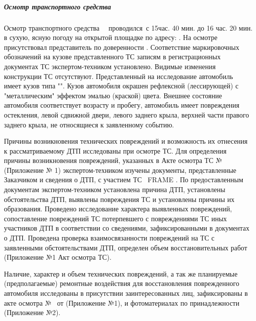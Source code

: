 \subparagraph*{Осмотр транспортного средства }
\noindent \begin{spacing}{1.2} { Осмотр транспортного средства \, \, проводился \osm\,с 15час. 40 мин. до 16 час. 20 мин. в сухую, ясную погоду  на открытой площадке по адресу: . На осмотре присутствовал представитель по доверенности  .  %
Соответствие маркировочных обозначений на кузове представленного ТС записям в регистрационных документах ТС экс\-пертом-техником установлено. Видимые изменения конструкции ТС отсутствуют.  Представленный на исследование автомобиль \tc\, имеет кузов типа "". Кузов автомобиля окрашен  рефлексной (лессирующей) с "металлическим" эффектом 
эмалью (краской) \colr цвета. Внешнее состояние автомобиля соответствует возрасту и пробегу, автомобиль имеет повреждения остекления, левой сдвижной двери, левого заднего крыла, верхней части правого заднего крыла, не относящиеся к заявленному событию.  %
\par Причины возникновения технических повреждений и возможность их отнесения к рассматриваемому ДТП исследованы при осмотре ТС. 
Для определения причины возникновения повреждений, указанных в Акте осмотра ТС 
№ \NomerDoc \, (Приложение № 1) экспертом-техником изучены документы, представленные Заказчиком и сведения о ДТП, с участием ТС  \, FRAME . %
По предоставленным документам экспертом-техником установлена причина ДТП, установлены обстоятельства ДТП, выявлены повреждения ТС и установлены причины их образования. Проведено исследование характера выявленных повреждений, сопоставление повреждений ТС потерпевшего с повреждениями ТС иных участников ДТП в соответствии со сведениями, зафиксированными в документах о ДТП. Проведена проверка взаимосвязанности повреждений на ТС с заявленными обстоятельствами ДТП, определен объем восстановительных работ (Приложение №1 Акт осмотра ТС). 
\par Наличие, характер и объем технических повреждений, а так же  планируемые (предполагаемые) ремонтные воздействия для восстановления поврежденного автомобиля  исследованы в присутствии заинтересованных лиц, зафиксированы в акте осмотра № \NomerDoc \,  от \osm  (Приложение №1),  и фотоматериалах по принадлежности (Приложение №2).  }
\end{spacing}
